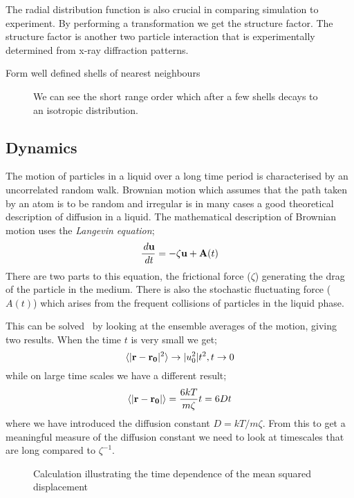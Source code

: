 The radial distribution function is also crucial in comparing simulation to experiment. By performing a transformation  we get the structure factor. The structure factor is another two particle interaction that is experimentally determined from x-ray diffraction patterns.

Form well defined shells of nearest neighbours~\cite[p2]{barrat:03}
\begin{figure}
    \label{fig:radial distribution}
    \caption{We can see the short range order which after a few shells decays to an isotropic distribution.}
\end{figure}

\subsection{Dynamics}
The motion of particles in a liquid over a long time period is characterised by an uncorrelated random walk. Brownian motion which assumes that the path taken by an atom is to be random and irregular is in many cases a good theoretical description of diffusion in a liquid. The mathematical description of Brownian motion uses the \emph{Langevin equation};
\begin{equation}
    \frac{\,d \mathbf{u}}{\,d t} = - \zeta \mathbf{u} + \mathbf{A}(t)
\end{equation}
There are two parts to this equation, the frictional force ($\zeta$) generating the drag of the particle in the medium. There is also the stochastic fluctuating force ($A(t)$) which arises from the frequent collisions of particles in the liquid phase.

This can be solved~\cite{mcquarrie:75} by looking at the ensemble averages of the motion, giving two results. When the time $t$ is very small we get;
\begin{equation}
    \langle | \mathbf{r} - \mathbf{r_0}|^2 \rangle \rightarrow |u_0^2|t^2,   t \rightarrow 0
\end{equation}
while on large time scales we have a different result;
\begin{equation}
    \langle | \mathbf{r} - \mathbf{r_0} | \rangle = \frac{6kT}{m\zeta} t = 6Dt
\end{equation}
where we have introduced the diffusion constant $D = kT/m\zeta$. From this to get a meaningful measure of the diffusion constant we need to look at timescales that are long compared to $\zeta^{-1}$.


\begin{figure}
    \label{fig:MSD}
    \caption{Calculation illustrating the time dependence of the mean squared displacement}
\end{figure}

